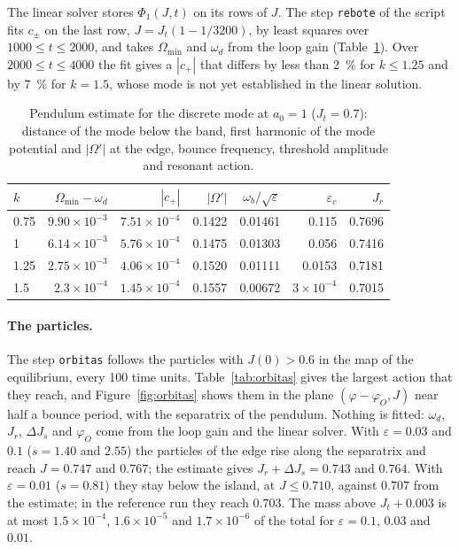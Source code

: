 \documentclass[11pt,a4paper]{article}
\begin{document}
The linear solver stores $\Phi_1(J,t)$ on its rows of $J$. The step \texttt{rebote} of the
script fits $c_\pm$ on the last row, $J=J_t(1-1/3200)$, by least squares over
$1000\le t\le2000$, and takes $\Omega_{\min}$ and $\omega_d$ from the loop gain
(Table~\ref{tab:rebote}). Over $2000\le t\le4000$ the fit gives a $|c_+|$ that differs by less
than \SI{2}{\%} for $k\le1.25$ and by \SI{7}{\%} for $k=1.5$, whose mode is not yet established
in the linear solution.

\begin{table}[!htbp]
\centering
\small
\begin{tabular}{lrrrrrr}
\toprule
$k$ & $\Omega_{\min}-\omega_d$ & $|c_+|$ & $|\Omega'|$ & $\omega_b/\sqrt{\varepsilon}$ & $\varepsilon_c$ & $J_r$\\
\midrule
0.75 & $9.90\times10^{-3}$ & $7.51\times10^{-4}$ & 0.1422 & 0.01461 & 0.115 & 0.7696\\
1 & $6.14\times10^{-3}$ & $5.76\times10^{-4}$ & 0.1475 & 0.01303 & 0.056 & 0.7416\\
1.25 & $2.75\times10^{-3}$ & $4.06\times10^{-4}$ & 0.1520 & 0.01111 & 0.0153 & 0.7181\\
1.5 & $2.3\times10^{-4}$ & $1.45\times10^{-4}$ & 0.1557 & 0.00672 & $3\times10^{-4}$ & 0.7015\\
\bottomrule
\end{tabular}
\caption{Pendulum estimate for the discrete mode at $a_0=1$ ($J_t=0.7$): distance of the mode
below the band, first harmonic of the mode potential and $|\Omega'|$ at the edge, bounce
frequency, threshold amplitude and resonant action.}
\label{tab:rebote}
\end{table}

\paragraph{The particles.} The step \texttt{orbitas} follows the particles with $J(0)>0.6$ in
the map of the equilibrium, every 100 time units. Table~\ref{tab:orbitas} gives the largest
action that they reach, and Figure~\ref{fig:orbitas} shows them in the plane
$(\varphi-\varphi_O,J)$ near half a bounce period, with the separatrix of the pendulum. Nothing is
fitted: $\omega_d$, $J_r$, $\Delta J_s$ and $\varphi_O$ come from the loop gain and the linear solver.
With $\varepsilon=0.03$ and $0.1$ ($s=1.40$ and $2.55$) the particles of the edge rise along the
separatrix and reach $J=0.747$ and $0.767$; the estimate gives $J_r+\Delta J_s=0.743$ and
$0.764$. With $\varepsilon=0.01$ ($s=0.81$) they stay below the island, at $J\le0.710$, against
$0.707$ from the estimate; in the reference run they reach $0.703$. The mass above $J_t+0.003$
is at most $1.5\times10^{-4}$, $1.6\times10^{-5}$ and $1.7\times10^{-6}$ of the total for
$\varepsilon=0.1$, $0.03$ and $0.01$.
\end{document}
